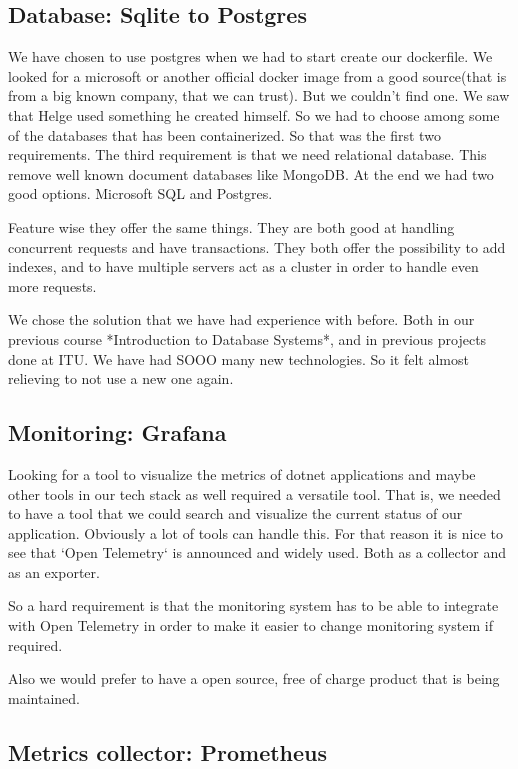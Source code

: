 \subsection{Database: Sqlite to Postgres}

We have chosen to use postgres when we had to start create our dockerfile. We looked for a microsoft or another official docker image from a good source(that is from a big known company, that we can trust). But we couldn’t find one. We saw that Helge used something he created himself. So we had to choose among some of the databases that has been containerized. So that was the first two requirements. The third requirement is that we need relational database. This remove well known document databases like MongoDB. At the end we had two good options. Microsoft SQL and Postgres.

Feature wise they offer the same things. They are both good at handling concurrent requests and have transactions. They both offer the possibility to add indexes, and to have multiple servers act as a cluster in order to handle even more requests.

We chose the solution that we have had experience with before. Both in our previous course *Introduction to Database Systems*, and in previous projects done at ITU. We have had SOOO many new technologies. So it felt almost relieving to not use a new one again.

\subsection{Monitoring: Grafana}

Looking for a tool to visualize the metrics of dotnet applications and maybe other tools in our tech stack as well required a versatile tool. That is, we needed to have a tool that we could search and visualize the current status of our application. Obviously a lot of tools can handle this. For that reason it is nice to see that `Open Telemetry` is announced and widely used. Both as a collector and as an exporter.

So a hard requirement is that the monitoring system has to be able to integrate with Open Telemetry in order to make it easier to change monitoring system if required.

Also we would prefer to have a open source, free of charge product that is being maintained.

\subsection{Metrics collector: Prometheus}

